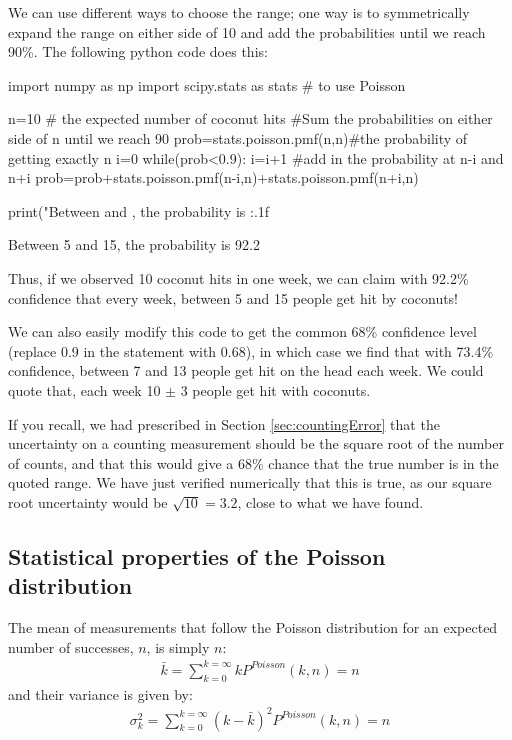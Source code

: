 \begin{example}
We can use different ways to choose the range; one way is to symmetrically expand the range on either side of 10 and add the probabilities until we reach 90\%. The following python code does this:
\begin{python}[caption = Computing a 90\% confidence interval] 
import numpy as np
import scipy.stats as stats # to use Poisson

n=10 # the expected number of coconut hits
#Sum the probabilities on either side of n until we reach 90%
prob=stats.poisson.pmf(n,n)#the probability of getting exactly n
i=0
while(prob<0.9):
    i=i+1
    #add in the probability at n-i and n+i
    prob=prob+stats.poisson.pmf(n-i,n)+stats.poisson.pmf(n+i,n)
    
print("Between {} and {}, the probability is {:.1f}%
\end{python}
\begin{poutput}
Between 5 and 15, the probability is 92.2%
\end{poutput}
Thus, if we observed 10 coconut hits in one week, we can claim with 92.2\% confidence that every week, between 5 and 15 people get hit by coconuts! 

We can also easily modify this code to get the common 68\% confidence level (replace 0.9 in the  statement with 0.68), in which case we find that with 73.4\% confidence, between 7 and 13 people get hit on the head each week. We could quote that, each week 10 $\pm$ 3 people get hit with coconuts.

If you recall, we had prescribed in Section \ref{sec:countingError} that the uncertainty on a counting measurement should be the square root of the number of counts, and that this would give a 68\% chance that the true number is in the quoted range. We have just verified numerically that this is true, as our square root uncertainty would be $\sqrt{10}=3.2$, close to what we have found. 
\end{example}   

\subsection{Statistical properties of the Poisson distribution}
The mean of measurements that follow the Poisson distribution for an expected number of successes, $n$, is simply $n$:
\begin{align}
\bar k = \sum_{k=0}^{k=\infty}kP^{Poisson}(k,n)=n
\end{align}
and their variance is given by:
\begin{align}
\sigma_k^2 = \sum_{k=0}^{k=\infty}(k-\bar k)^2P^{Poisson}(k,n)=n
\end{align}

